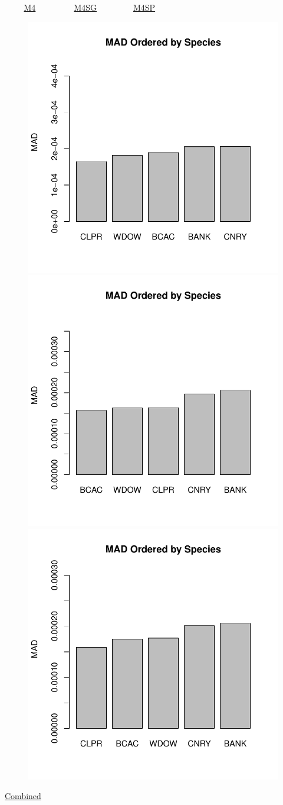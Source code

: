 \documentclass[ xcolor = pdftex, dvipsnames, table ]{beamer}
\begin{document}
\begin{frame}{$~~~~~~~~~$ \href{https://github.com/gasduster99/sppComp/tree/master/sscRuns/25319781982M4}{M4} $~~~~~~~~~~~~~~~~~~$ \href{https://github.com/gasduster99/sppComp/tree/master/sscRuns/25319781982M4IGSG}{M4SG} $~~~~~~~~~~~~~~~~~$ \href{https://github.com/gasduster99/sppComp/tree/master/sscRuns/25319781982M4IGSP}{M4SP} }
        \begin{figure}[ht!]
        \centering
        \hspace*{-1cm}
        \includegraphics[width=.4\textwidth]{../sscRuns/25319781982M4/sppHeadMad68.pdf}
        \includegraphics[width=.4\textwidth]{../sscRuns/25319781982M4IGSG/sppHeadMad68.pdf}
        \includegraphics[width=.4\textwidth]{../sscRuns/25319781982M4IGSP/sppHeadMad68.pdf}
        \end{figure}
	\vspace{-1cm}
	\begin{center}
	\Large
	\href{https://github.com/gasduster99/sppComp/tree/master/try1/postSSC/25319781982M4IGSPSG}{Combined}
	\end{center}
\end{frame}
\end{document}
